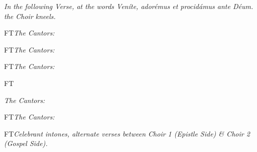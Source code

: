 \documentclass[letterpaper,12pt]{book} %
\renewcommand{\needspace}[1]{
	\checkoddpage\ifoddpage\oldneedspace{#1}\else\fi
}
\def\shouldprintwhointones{F}
\newcommand{\ifprintwhointones}[2]{\if\shouldprintwhointones T#1\else#2\fi}
\begin{document}
{
	\bigskip
	\emph{\small In the following Verse, at the words \emph{Veníte, adorémus et procidámus ante Déum.} the Choir kneels.}

	\ifprintwhointones{\noindent\emph{The Cantors:}
	\smallskip

	}{}
	\def\annot{\small \Vbar{} 3.}

}

\bigskip
\ifprintwhointones{\noindent\emph{The Cantors:}

\smallskip
}{}
{
	\def\annot{\small \Vbar{} 4.}

}

\bigskip
\ifprintwhointones{\noindent\emph{The Cantors:}

\smallskip
}{}
{
	\def\annot{\small \Vbar{} 5.}

}

\bigskip
\ifprintwhointones{\needspace{6\baselineskip}
\noindent\emph{The Cantors:}

}{}
{
	\def\annot{\small \Vbar{} 6.}


	\bigskip
	\ifprintwhointones{\noindent\emph{The Cantors:}

	}{}
	\printinvitatoryant{}
}


{
	\bigskip
	\ifprintwhointones{\noindent\emph{Celebrant intones, alternate verses between Choir 1 (Epistle Side) \& Choir 2 (Gospel Side).}

	}{}
}

\pagebreak
\def\alwaysrepeatantiphon{T}
{
	
}

{
	
}

{
	
}

\pagebreak
{
	\def\gabcfolder{../Tenebrae}
	
}
\end{document}
